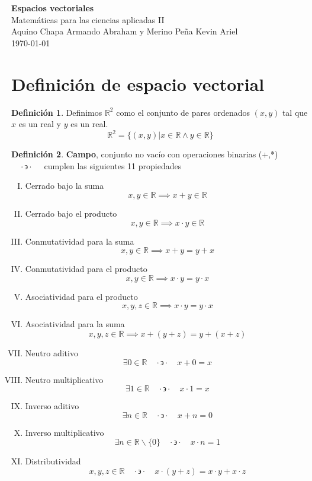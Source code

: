 \documentclass[letterpaper]{article}
\newcommand{\tq}{ \quad \cdot  \backepsilon \cdot \quad }
\newcommand{\R}{\mathds{R}}
\renewcommand{\*}{\cdot}
\theoremstyle{definition}
\newtheorem{definition}{Definición}[section]
\begin{document}
		\begin{titlepage}
		\begin{center}
			\Large{\textbf{Espacios vectoriales}} \\[0.1cm]
			\huge{Matemáticas para las ciencias aplicadas II}\\[0.2cm]
			\large{Aquino Chapa Armando Abraham y Merino Peña Kevin Ariel }
			\\
			\today
		\end{center}
		\let\newpage\relax%
		\hrulefill
	\end{titlepage}
	\section{Definición de espacio vectorial}
	\begin{definition}
		Definimos $ \R^2 $ como el conjunto de pares ordenados $ (x,y) $ tal que $ x $ es un real y $ y $ es un real.
		\[ \R^2 = \{(x,y) | x \in \R \land y \in \R \} \]
	\end{definition}
	\begin{definition}
		\textbf{Campo}, conjunto no vacío con operaciones binarias (+,*) 
		$ \tq $ cumplen las siguientes 11 propiedades
		\begin{enumerate}[(I)]
			\item Cerrado bajo la suma
			\[x,y \in \R \implies x + y \in \R \]
			\item  Cerrado bajo el producto
			\[  x,y \in \R \implies x\cdot y \in \R \]
			\item Conmutatividad para la suma
			\[  x,y \in \R \implies x + y = y + x\]
			\item Conmutatividad para el producto
			\[  x,y \in \R \implies x \cdot y  = y\cdot x \]
			\item Asociatividad para el producto
			\[  x,y,z \in \R \implies x\* y = y \* x \]
			\item Asociatividad para la suma
			\[  x,y,z  \in \R \implies x +(y+z) = y + (x +z)  \]
			\item Neutro aditivo
			\[ \exists 0 \in \R \tq x + 0 = x \]
			\item Neutro multiplicativo
			\[ \exists 1 \in \R \tq x \* 1 = x  \]
			\item Inverso aditivo
			\[ \exists n  \in \R \tq x + n = 0  \]
			\item Inverso multiplicativo
			\[ \exists n \in \R \backslash \{0\} \tq x\* n = 1 \]
			\item Distributividad
			\[ x,y,z \in \R \tq x \*(y+z) = x\* y + x \* z  \]
		\end{enumerate}
	\end{definition}
\end{document}
